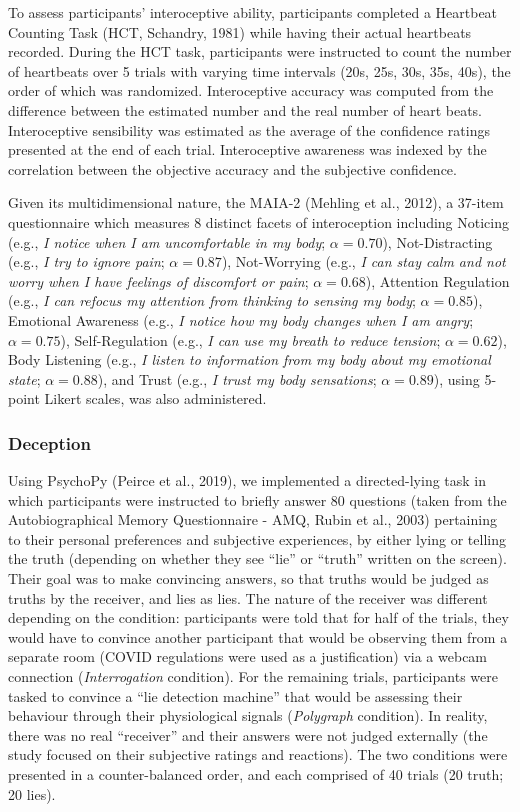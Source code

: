 \documentclass[
  man,mask,floatsintext]{apa6}
\begin{document}
To assess participants' interoceptive ability, participants completed a Heartbeat Counting Task (HCT, Schandry, 1981) while having their actual heartbeats recorded. During the HCT task, participants were instructed to count the number of heartbeats over 5 trials with varying time intervals (20s, 25s, 30s, 35s, 40s), the order of which was randomized. Interoceptive accuracy was computed from the difference between the estimated number and the real number of heart beats. Interoceptive sensibility was estimated as the average of the confidence ratings presented at the end of each trial. Interoceptive awareness was indexed by the correlation between the objective accuracy and the subjective confidence.

Given its multidimensional nature, the MAIA-2 (Mehling et al., 2012), a 37-item questionnaire which measures 8 distinct facets of interoception including Noticing (e.g., \emph{I notice when I am uncomfortable in my body}; \(\alpha = 0.70\)), Not-Distracting (e.g., \emph{I try to ignore pain}; \(\alpha = 0.87\)), Not-Worrying (e.g., \emph{I can stay calm and not worry when I have feelings of discomfort or pain}; \(\alpha = 0.68\)), Attention Regulation (e.g., \emph{I can refocus my attention from thinking to sensing my body}; \(\alpha = 0.85\)), Emotional Awareness (e.g., \emph{I notice how my body changes when I am angry}; \(\alpha = 0.75\)), Self-Regulation (e.g., \emph{I can use my breath to reduce tension}; \(\alpha = 0.62\)), Body Listening (e.g., \emph{I listen to information from my body about my emotional state}; \(\alpha = 0.88\)), and Trust (e.g., \emph{I trust my body sensations}; \(\alpha = 0.89\)), using 5-point Likert scales, was also administered.

\hypertarget{deception}{%
\subsubsection{Deception}\label{deception}}

Using PsychoPy (Peirce et al., 2019), we implemented a directed-lying task in which participants were instructed to briefly answer 80 questions (taken from the Autobiographical Memory Questionnaire - AMQ, Rubin et al., 2003) pertaining to their personal preferences and subjective experiences, by either lying or telling the truth (depending on whether they see ``lie'' or ``truth'' written on the screen). Their goal was to make convincing answers, so that truths would be judged as truths by the receiver, and lies as lies. The nature of the receiver was different depending on the condition: participants were told that for half of the trials, they would have to convince another participant that would be observing them from a separate room (COVID regulations were used as a justification) via a webcam connection (\emph{Interrogation} condition). For the remaining trials, participants were tasked to convince a ``lie detection machine'' that would be assessing their behaviour through their physiological signals (\emph{Polygraph} condition). In reality, there was no real ``receiver'' and their answers were not judged externally (the study focused on their subjective ratings and reactions). The two conditions were presented in a counter-balanced order, and each comprised of 40 trials (20 truth; 20 lies).
\end{document}
